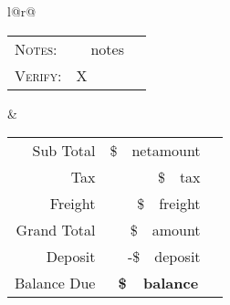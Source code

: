 \documentclass{report}
\begin{document}
\begin{tabular*}{\textwidth}{l@{\extracolsep{\fill}}r@{}}
  \begin{tabular}[b]{p{.5in}p{3in}}
    \normalsize \scshape Notes: & \normalfont ~~notes~~
    \vspace{.25in} \\
    \scshape Verify: & X \\
    \cline{2-2}
  \end{tabular}
  &
  \begin{tabular}{rr}
    \Large Sub Total & \Large \$~~netamount~~ \\ 
    \cline{2-2}
    Tax & \$~~tax~~ \\
    Freight & \$~~freight~~ \\
    \Large Grand Total & \Large \$~~amount~~ \\
    \cline{2-2}
    Deposit & -\$~~deposit~~ \\
    \Large Balance Due & \Large \bfseries \$~~balance~~ \\
    \cline{2-2}
  \end{tabular}
\end{tabular*}

\end{document}
